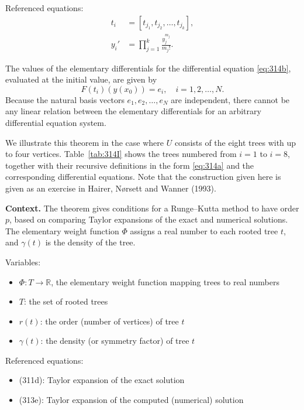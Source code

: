 Referenced equations:
\begin{align}
    t_i &= [t_{j_1}, t_{j_2}, \dots, t_{j_k}], \tag{314a}\\
    y_i' &= \prod_{j=1}^k \frac{y_j^{m_j}}{m_j!}. \tag{314b}
\end{align}

\begin{theorem}

  \label{thm:314A}
The values of the elementary differentials for the differential equation \eqref{eq:314b}, evaluated at the initial value, are given by
\[
F(t_i)(y(x_0)) = e_i, \quad i = 1, 2, \dots, N.
\]
Because the natural basis vectors \( e_1, e_2, \dots, e_N \) are independent, there cannot be any linear relation between the elementary differentials for an arbitrary differential equation system.

We illustrate this theorem in the case where \( U \) consists of the eight trees with up to four vertices. Table~\ref{tab:314I} shows the trees numbered from \( i = 1 \) to \( i = 8 \), together with their recursive definitions in the form \eqref{eq:314a} and the corresponding differential equations. Note that the construction given here is given as an exercise in Hairer, Nørsett and Wanner (1993).
\end{theorem}

\noindent\textbf{Context.}
The theorem gives conditions for a Runge--Kutta method to have order $p$, based on comparing Taylor expansions of the exact and numerical solutions. The elementary weight function $\Phi$ assigns a real number to each rooted tree $t$, and $\gamma(t)$ is the density of the tree.

Variables:
\begin{itemize}
    \item $\Phi: T \to \mathbb{R}$, the elementary weight function mapping trees to real numbers
    \item $T$: the set of rooted trees
    \item $r(t)$: the order (number of vertices) of tree $t$
    \item $\gamma(t)$: the density (or symmetry factor) of tree $t$
\end{itemize}

Referenced equations:
\begin{itemize}
    \item (311d): Taylor expansion of the exact solution
    \item (313e): Taylor expansion of the computed (numerical) solution
\end{itemize}

